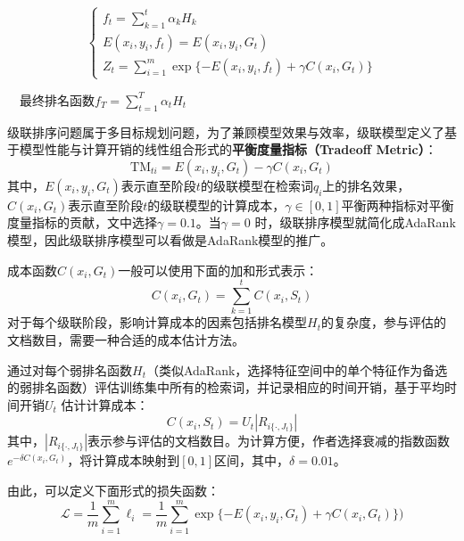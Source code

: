 \begin{algorithm}[htbp]
\begin{algorithmic}
\begin{enumerate}
\begin{equation}
                    \left\{
                    \begin{array}{l}
                      f_t = \sum\limits_{k=1}^t \alpha_k H_k\\
                      E(x_i,y_i,f_t) = E(x_i,y_i,G_t)\\
                      Z_t = \sum\limits_{i=1}^{m} \exp\{-E(x_i,y_i,f_t) + \gamma C(x_i,G_t)\}
                    \end{array}
                    \right.
                \end{equation}
            \end{enumerate}
            \ENDFOR
            \ENSURE ~~最终排名函数$f_T = \sum\limits_{t=1}^{T}{\alpha_t H_t}$
        \end{algorithmic}
\end{algorithm}

级联排序问题属于多目标规划问题，为了兼顾模型效果与效率，级联模型定义了基于模型性能与计算开销的线性组合形式的\textbf{平衡度量指标（Tradeoff Metric）}：
\begin{equation}
    \mathrm{TM}_{ti} = E(x_i, y_i, G_t) - \gamma C(x_i, G_t)
\end{equation}
其中，$E(x_i,y_i,G_t)$表示直至阶段$t$的级联模型在检索词$q_i$上的排名效果，$C(x_i,G_t)$表示直至阶段$t$的级联模型的计算成本，$\gamma \in [0,1]$平衡两种指标对平衡度量指标的贡献，文中选择$\gamma = 0.1$。当$\gamma = 0$ 时，级联排序模型就简化成AdaRank模型，因此级联排序模型可以看做是AdaRank模型的推广。

成本函数$C(x_i, G_t)$一般可以使用下面的加和形式表示：
\begin{equation}
    C(x_i, G_t) = \sum\limits_{k=1}^t C(x_i, S_t)
\end{equation}
对于每个级联阶段，影响计算成本的因素包括排名模型$H_t$的复杂度，参与评估的文档数目，需要一种合适的成本估计方法。

通过对每个弱排名函数$H_t$（类似AdaRank，选择特征空间中的单个特征作为备选的弱排名函数）评估训练集中所有的检索词，并记录相应的时间开销，基于平均时间开销$U_t$ 估计计算成本：
\begin{equation}
    C(x_i, S_t) = U_t |R_{i\{\cdot, J_t\}}|
\end{equation}
其中，$|R_{i\{\cdot, J_t\}}|$表示参与评估的文档数目。为计算方便，作者选择衰减的指数函数$e^{-\delta C(x_i, G_t)}$，将计算成本映射到$[0,1]$区间，其中，$\delta  = 0.01$。

由此，可以定义下面形式的损失函数：
\begin{equation}
    \mathcal{L} = \frac{1}{m}\sum\limits_{i=1}^m \ell_i = \frac{1}{m} \sum\limits_{i=1}^m \exp \{ - E(x_i,y_i,G_t) + \gamma C(x_i,G_t)\})
\end{equation}

